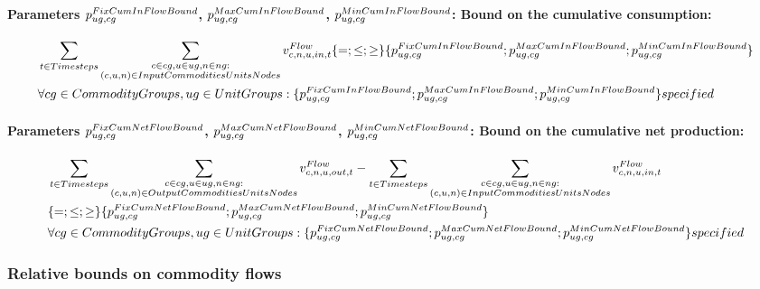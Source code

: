 \paragraph{Parameters $\pFixCumInFlowBound$, $\pMaxCumInFlowBound$, $\pMinCumInFlowBound$: Bound on the cumulative consumption:}
\begin{align} \label{eq:cuminflowbound}
&\sum_{\timesteps} \sum_{\substack{\commodity \in \commoditygroup, \unit \in \unitgroup, \node \in \nodegroup: \\ \InputCommoditiesUnitsNodes}} \vFlow[\commodity,\node,\unit,in,\timestep]  \{=;\le;\ge\} \{\pFixCumInFlowBound ; \pMaxCumInFlowBound ; \pMinCumInFlowBound \} \nonumber \\
&\forall \commoditygroups, \unitgroups : \{\pFixCumInFlowBound ; \pMaxCumInFlowBound ; \pMinCumInFlowBound \} specified
\end{align}

\paragraph{Parameters $\pFixCumNetFlowBound$, $\pMaxCumNetFlowBound$, $\pMinCumNetFlowBound$: Bound on the cumulative net production:}
\begin{align} \label{eq:cumnetflowbound}
&\sum_{\timesteps} \sum_{\substack{\commodity \in \commoditygroup, \unit \in \unitgroup, \node \in \nodegroup: \\ \OutputCommoditiesUnitsNodes}} \vFlow[\commodity,\node,\unit,out,\timestep] - \sum_{\timesteps} \sum_{\substack{\commodity \in \commoditygroup, \unit \in \unitgroup, \node \in \nodegroup: \\ \InputCommoditiesUnitsNodes}} \vFlow[\commodity,\node,\unit,in,\timestep]  \nonumber \\
&\{=;\le;\ge\} \{\pFixCumNetFlowBound; \pMaxCumNetFlowBound; \pMinCumNetFlowBound \} \nonumber \\
&\forall \commoditygroups, \unitgroups: \{\pFixCumNetFlowBound; \pMaxCumNetFlowBound; \pMinCumNetFlowBound \} specified
\end{align}



\subsubsection{Relative bounds on commodity flows}

